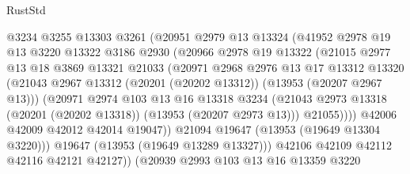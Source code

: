 \begin{lexlean}{RustStd}
\begin{coremodule}
                      @3234
                      @3255
                      @13303
                      @3261
                      (@20951
                        @2979
                        @13
                        @13324
                        (@41952
                          @2978
                          @19
                          @13
                          @3220
                          @13322
                          @3186
                          @2930
                          (@20966
                            @2978
                            @19
                            @13322
                            (@21015
                              @2977
                              @13
                              @18
                              @3869
                              @13321
                              @21033
                              (@20971
                                @2968
                                @2976
                                @13
                                @17
                                @13312
                                @13320
                                (@21043
                                  @2967
                                  @13312
                                  (@20201 (@20202 @13312))
                                  (@13953 (@20207 @2967 @13)))
                                (@20971
                                  @2974
                                  @103
                                  @13
                                  @16
                                  @13318
                                  @3234
                                  (@21043
                                    @2973
                                    @13318
                                    (@20201 (@20202 @13318))
                                    (@13953 (@20207 @2973 @13)))
                                  @21055))))
                          @42006
                          @42009
                          @42012
                          @42014
                          @19047))
                      @21094
                      @19647
                      (@13953 (@19649 @13304 @3220)))
                    @19647
                    (@13953 (@19649 @13289 @13327)))
                  @42106
                  @42109
                  @42112
                  @42116
                  @42121
                  @42127))
              (@20939
                @2993
                @103
                @13
                @16
                @13359
                @3220

\end{coremodule}
\end{lexlean}
